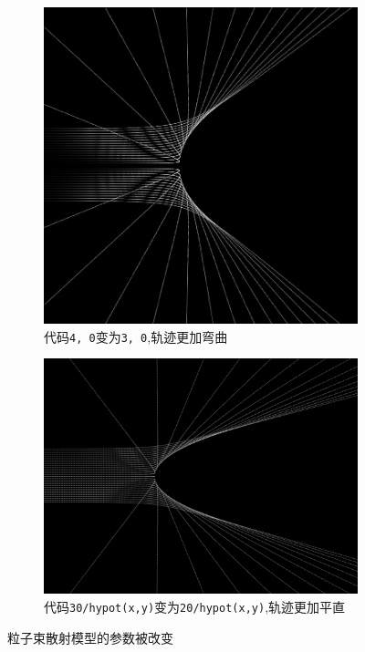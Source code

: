 \documentclass[12pt]{article}
\begin{document}
\begin{figure}[h]
  \centering
  \begin{subfigure}[b]{0.4\linewidth}
    \includegraphics[width=\linewidth]{distortion_scatter.png}
    \caption{代码\texttt{4, 0}变为\texttt{3, 0},轨迹更加弯曲}
  \end{subfigure}
  \begin{subfigure}[b]{0.5\linewidth}
    \includegraphics[width=\linewidth]{distortion2_scatter.png}
    \caption{代码\texttt{30/hypot(x,y)}变为\texttt{20/hypot(x,y)},轨迹更加平直}
  \end{subfigure}
  \caption{粒子束散射模型的参数被改变}
  \label{fig:distortion_scatter}
\end{figure}
\end{document}

